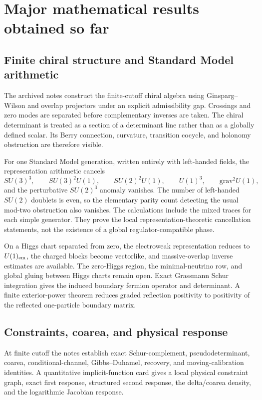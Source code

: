 \documentclass[11pt]{article}
\begin{document}
\section{Major mathematical results obtained so far}
\label{sec:v11v1-results}

\subsection{Finite chiral structure and Standard Model arithmetic}

The archived notes construct the finite-cutoff chiral algebra using
Ginsparg--Wilson and overlap projectors under an explicit admissibility
gap.  Crossings and zero modes are separated before complementary
inverses are taken.  The chiral determinant is treated as a section of a
determinant line rather than as a globally defined scalar.  Its Berry
connection, curvature, transition cocycle, and holonomy obstruction are
therefore visible.

For one Standard Model generation, written entirely with left-handed
fields, the representation arithmetic cancels
\[
 SU(3)^3,\qquad SU(3)^2U(1),\qquad SU(2)^2U(1),\qquad
 U(1)^3,\qquad \mathrm{grav}^2U(1),
\]
and the perturbative \(SU(2)^3\) anomaly vanishes.  The number of
left-handed \(SU(2)\) doublets is even, so the elementary parity count
detecting the usual mod-two obstruction also vanishes.  The calculations
include the mixed traces for each simple generator.  They prove the local
representation-theoretic cancellation statements, not the existence of a
global regulator-compatible phase.

On a Higgs chart separated from zero, the electroweak representation
reduces to \(U(1)_{\rm em}\), the charged blocks become vectorlike, and
massive-overlap inverse estimates are available.  The zero-Higgs region,
the minimal-neutrino row, and global gluing between Higgs charts remain
open.  Exact Grassmann Schur integration gives the induced boundary
fermion operator and determinant.  A finite exterior-power theorem reduces
graded reflection positivity to positivity of the reflected
one-particle boundary matrix.

\subsection{Constraints, coarea, and physical response}

At finite cutoff the notes establish exact Schur-complement,
pseudodeterminant, coarea, conditional-channel, Gibbs--Duhamel, recovery,
and moving-calibration identities.  A quantitative implicit-function
card gives a local physical constraint graph, exact first response,
structured second response, the delta/coarea density, and the logarithmic
Jacobian response.
\end{document}
